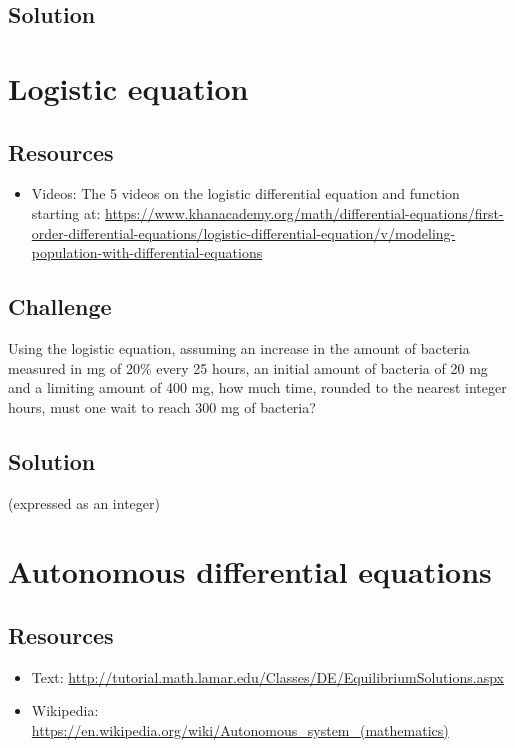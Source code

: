 \subsection*{Solution}
\six{\%}


\timebox



\newpage
\section{Logistic equation}

\subsection*{Resources}
\begin{itemize}
    \item Videos: The 5 videos on the logistic differential equation and function starting at: \url{https://www.khanacademy.org/math/differential-equations/first-order-differential-equations/logistic-differential-equation/v/modeling-population-with-differential-equations}
\end{itemize}

\subsection*{Challenge}
Using the logistic equation, assuming an increase in the amount of bacteria measured in mg of 20\% every 25 hours, an initial amount of bacteria of 20 mg and a limiting amount of 400 mg, how much time, rounded to the nearest integer hours, must one wait to reach 300 mg of bacteria?

\subsection*{Solution}
 (expressed as an integer)


\timebox



\newpage
\section{Autonomous differential equations}

\subsection*{Resources}
\begin{itemize}
    \item Text: \url{http://tutorial.math.lamar.edu/Classes/DE/EquilibriumSolutions.aspx}
    \item Wikipedia: \url{https://en.wikipedia.org/wiki/Autonomous_system_(mathematics)}
\end{itemize}

